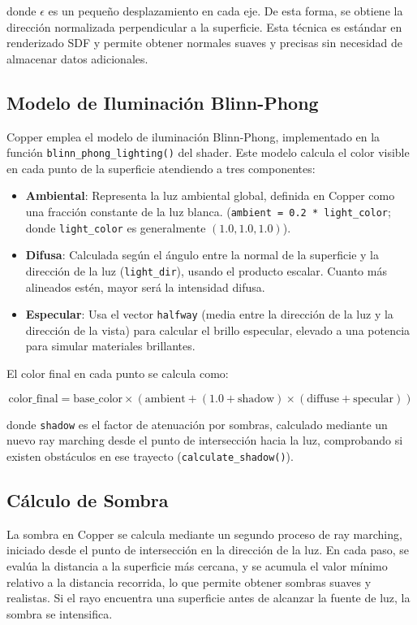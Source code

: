donde $\epsilon$ es un pequeño desplazamiento en cada eje. De esta forma, se
obtiene la dirección normalizada perpendicular a la superficie. Esta técnica es
estándar en renderizado SDF y permite obtener normales suaves y precisas sin
necesidad de almacenar datos adicionales.

\subsection{Modelo de Iluminación Blinn-Phong}

Copper emplea el modelo de iluminación Blinn-Phong, implementado en la función
\texttt{blinn\_phong\_lighting()} del shader. Este modelo calcula el color
visible en cada punto de la superficie atendiendo a tres componentes:

\begin{itemize}
    \item \textbf{Ambiental}: Representa la luz ambiental global, definida en Copper como una fracción constante de la luz blanca. (\texttt{ambient = 0.2 * light\_color}; donde \texttt{light\_color} es generalmente $(1.0, 1.0, 1.0)$).
    \item \textbf{Difusa}: Calculada según el ángulo entre la normal de la superficie y la dirección de la luz (\texttt{light\_dir}), usando el producto escalar. Cuanto más alineados estén, mayor será la intensidad difusa.
    \item \textbf{Especular}: Usa el vector \texttt{halfway} (media entre la dirección de la luz y la dirección de la vista) para calcular el brillo especular, elevado a una potencia para simular materiales brillantes.
\end{itemize}

El color final en cada punto se calcula como:

\[
    \text{color\_final} = \text{base\_color} \times (\text{ambient} + (1.0 + \text{shadow}) \times (\text{diffuse} + \text{specular}))
\]

donde \texttt{shadow} es el factor de atenuación por sombras, calculado
mediante un nuevo ray marching desde el punto de intersección hacia la luz,
comprobando si existen obstáculos en ese trayecto
(\texttt{calculate\_shadow()}).

\subsection{Cálculo de Sombra}

La sombra en Copper se calcula mediante un segundo proceso de ray marching,
iniciado desde el punto de intersección en la dirección de la luz. En cada
paso, se evalúa la distancia a la superficie más cercana, y se acumula el valor
mínimo relativo a la distancia recorrida, lo que permite obtener sombras suaves
y realistas. Si el rayo encuentra una superficie antes de alcanzar la fuente de
luz, la sombra se intensifica.

